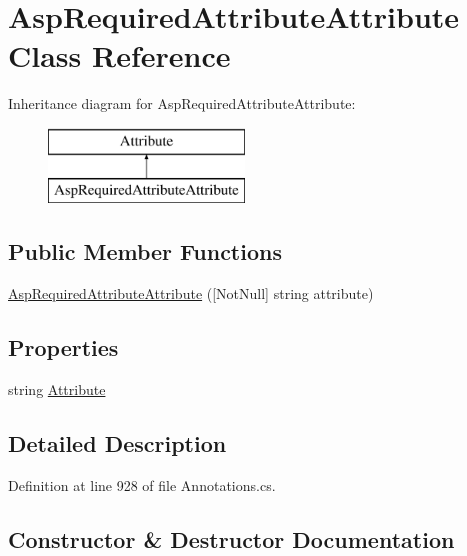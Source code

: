 \hypertarget{class_asp_required_attribute_attribute}{}\section{Asp\+Required\+Attribute\+Attribute Class Reference}
\label{class_asp_required_attribute_attribute}
Inheritance diagram for Asp\+Required\+Attribute\+Attribute\+:\begin{figure}[H]
\begin{center}
\leavevmode
\includegraphics[height=2.000000cm]{class_asp_required_attribute_attribute}
\end{center}
\end{figure}
\subsection*{Public Member Functions}
\begin{DoxyCompactItemize}
\item 
\hyperlink{class_asp_required_attribute_attribute_a37e197f5a5990c0140d0dc75be9ad6a6}{Asp\+Required\+Attribute\+Attribute} (\mbox{[}Not\+Null\mbox{]} string attribute)
\end{DoxyCompactItemize}
\subsection*{Properties}
\begin{DoxyCompactItemize}
\item 
string \hyperlink{class_asp_required_attribute_attribute_a8d782b24a958ba36ee4d63265a5db96d}{Attribute}
\end{DoxyCompactItemize}


\subsection{Detailed Description}


Definition at line 928 of file Annotations.\+cs.



\subsection{Constructor \& Destructor Documentation}
\hypertarget{class_asp_required_attribute_attribute_a37e197f5a5990c0140d0dc75be9ad6a6}{}
